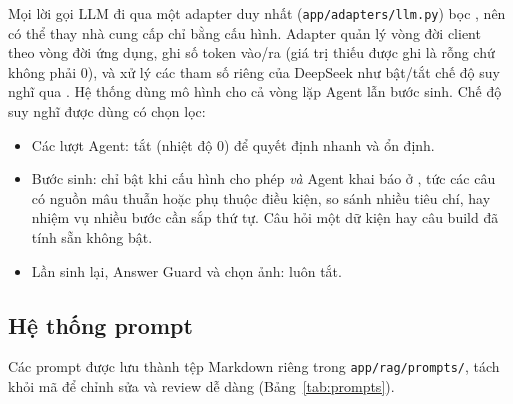 Mọi lời gọi LLM đi qua một adapter duy nhất (\nolinkurl{app/adapters/llm.py}) bọc , nên có thể thay nhà cung cấp chỉ bằng cấu hình. Adapter quản lý vòng đời client theo vòng đời ứng dụng, ghi số token vào/ra (giá trị thiếu được ghi là rỗng chứ không phải 0), và xử lý các tham số riêng của DeepSeek như bật/tắt chế độ suy nghĩ qua . Hệ thống dùng mô hình  cho cả vòng lặp Agent lẫn bước sinh. Chế độ suy nghĩ được dùng có chọn lọc:
\begin{itemize}
    \item Các lượt Agent: tắt (nhiệt độ 0) để quyết định nhanh và ổn định.
    \item Bước sinh: chỉ bật khi cấu hình cho phép \emph{và} Agent khai báo  ở , tức các câu có nguồn mâu thuẫn hoặc phụ thuộc điều kiện, so sánh nhiều tiêu chí, hay nhiệm vụ nhiều bước cần sắp thứ tự. Câu hỏi một dữ kiện hay câu build đã tính sẵn không bật.
    \item Lần sinh lại, Answer Guard và chọn ảnh: luôn tắt.
\end{itemize}

\subsection{Hệ thống prompt}
\label{sec:prompts}

Các prompt được lưu thành tệp Markdown riêng trong \nolinkurl{app/rag/prompts/}, tách khỏi mã để chỉnh sửa và review dễ dàng (Bảng~\ref{tab:prompts}).

